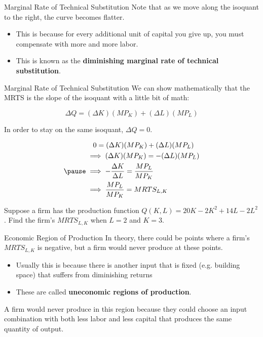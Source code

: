 \documentclass[11pt,t]{beamer}
\begin{document}
\begin{frame}{Marginal Rate of Technical Substitution}
  Note that as we move along the isoquant to the right, the curve becomes flatter.
  
  \bigskip
  \begin{itemize}
    \item This is because for every additional unit of capital you give up, you must compensate with more and more labor.

    \item This is known as the \textbf{diminishing marginal rate of technical substitution}.
  \end{itemize}
\end{frame}

\begin{frame}{Marginal Rate of Technical Substitution}
  We can show mathematically that the MRTS is the slope of the isoquant with a little bit of math:
  
  $$
    \Delta Q = (\Delta K)(MP_K) + (\Delta L)(MP_L)
  $$

  \pause\bigskip
  In order to stay on the same isoquant, $\Delta Q = 0$.

  \vspace*{-10mm}
  \begin{align*} 
    &\quad 0 = (\Delta K)(MP_K) + (\Delta L)(MP_L) \\
    &\implies (\Delta K)(MP_K) = - (\Delta L)(MP_L) \\\pause
    &\implies -\frac{\Delta K}{\Delta L} = \frac{MP_L}{MP_K} \\
    &\implies \frac{MP_L}{MP_K} = MRTS_{L,K}
  \end{align*}
\end{frame}

\begin{frame}
  
  \bigskip
  Suppose a firm has the production function $Q(K,L) = 20K-2K^2 + 14L - 2L^2$. Find the firm's $MRTS_{L,K}$ when $L=2$ and $K=3$.
\end{frame}

\begin{frame}{Economic Region of Production}
  In theory, there could be points where a firm's $MRTS_{L,K}$ is negative, but a firm would never produce at these points.
  
  \bigskip
  \begin{itemize}
    \item Usually this is because there is another input that is fixed (e.g. building space) that suffers from diminishing returns
    
    \pause
    \item These are called \textbf{uneconomic regions of production}.
  \end{itemize}

  \bigskip
  A firm would never produce in this region because they could choose an input combination with both less labor and less capital that produces the same quantity of output.
\end{frame}
\end{document}
